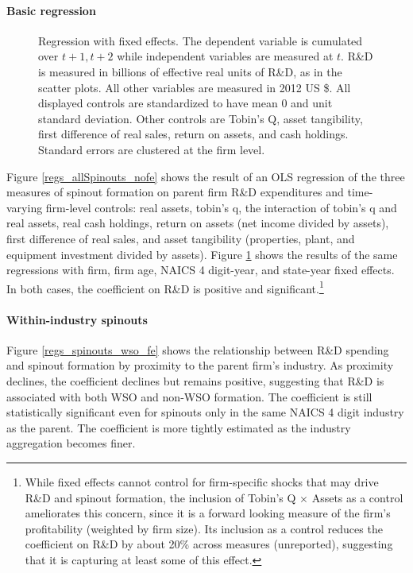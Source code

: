 \documentclass[12pt,english]{article}
\theoremstyle{remark}
\begin{document}
\paragraph{Basic regression}

\begin{figure}[h]
	\footnotesize
	\centering
	
	\caption{\footnotesize Regression with fixed effects. The dependent variable is cumulated over $t+1,t+2$ while independent variables are measured at $t$. R\&D is measured in billions of effective real units of R\&D, as in the scatter plots. All other variables are measured in 2012 US \$. All displayed controls are standardized to have mean 0 and unit standard deviation. Other controls are Tobin's Q, asset tangibility, first difference of real sales, return on assets, and cash holdings. Standard errors are clustered at the firm level.}
	\label{regs_allSpinouts_fe}
\end{figure}

Figure \ref{regs_allSpinouts_nofe} shows the result of an OLS regression of the three measures of spinout formation on parent firm R\&D expenditures and time-varying firm-level controls: real assets, tobin's q, the interaction of tobin's q and real assets, real cash holdings, return on assets (net income divided by assets), first difference of real sales, and asset tangibility (properties, plant, and equipment investment divided by assets). Figure \ref{regs_allSpinouts_fe} shows the results of the same regressions with firm, firm age, NAICS 4 digit-year, and state-year fixed effects. In both cases, the coefficient on R\&D is positive and significant.\footnote{While fixed effects cannot control for firm-specific shocks that may drive R\&D and spinout formation, the inclusion of Tobin's Q $\times$ Assets as a control ameliorates this concern, since it is a forward looking measure of the firm's profitability (weighted by firm size). Its inclusion as a control reduces the coefficient on R\&D by about 20\% across measures (unreported), suggesting that it is capturing at least some of this effect.} 

\paragraph{Within-industry spinouts}

Figure \ref{regs_spinouts_wso_fe} shows the relationship between R\&D spending and spinout formation by proximity to the parent firm's industry. As proximity declines, the coefficient declines but remains positive, suggesting that R\&D is associated with both WSO and non-WSO formation. The coefficient is still statistically significant even for spinouts only in the same NAICS 4 digit industry as the parent. The coefficient is more tightly estimated as the industry aggregation becomes finer.
\end{document}
